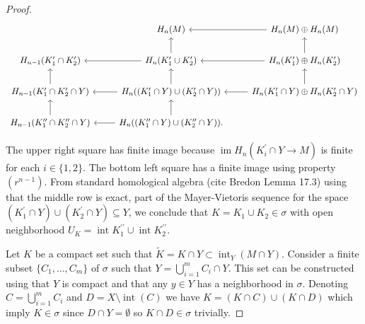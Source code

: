 \documentclass{amsart}
\newcommand{\dprime}{{\prime\prime}}
\DeclareMathOperator{\im}{im}
\DeclareMathOperator{\interior}{int}
\begin{document}
\begin{proof}
		\begin{equation*}
		\begin{tikzcd}
		& H_n(M) & \arrow[l] H_n(M) \oplus H_n(M) \\
		H_{n-1}(K_1^\prime \cap K_2^\prime) & 
		H_{n}(K_1^\prime \cup K_2^\prime) \arrow[l] \arrow[u] &
		H_{n}(K_1^\prime) \oplus H_n(K_2^\prime) \arrow[l] \arrow[u] \\
		H_{n-1}(K_1^\prime \cap K_2^\prime \cap Y) \arrow[u] & 
		H_{n}((K_1^\prime \cap Y) \cup (K_2^\prime \cap Y)) \arrow[l] \arrow[u] &
		H_{n}(K_1^\prime \cap Y) \oplus H_n(K_2^\prime \cap Y) \arrow[l] \arrow[u] \\
		H_{n-1}(K_1^\dprime \cap K_2^\dprime \cap Y) \arrow[u] & 
		H_{n}((K_1^\dprime \cap Y) \cup (K_2^\dprime \cap Y)) \arrow[l] \arrow[u]. &
		\end{tikzcd}
		\end{equation*}
		
		
		The upper right square has finite image because $\im H_n\left(K^\prime_i \cap Y \to M\right)$ is finite for each $i \in \{1, 2\}$. The bottom left square has a finite image using property $(r^{n-1})$. From standard homological algebra (cite Bredon 	Lemma 17.3) using that the middle row is exact, part of the Mayer-Vietoris sequence for the space $(K_1^\prime \cap Y) \cup (K_2^\prime \cap Y) \subseteq Y$, we conclude that $K = K_1 \cup K_2 \in \sigma$ with open neighborhood $U_K = \interior K^\dprime_1 \cup \interior K^\dprime_2$.
		
		Let $K$ be a compact set such that $\widetilde K = K \cap Y \subset \interior_Y(M \cap Y)$.
		Consider a finite subset $\{C_1, \dots, C_m\}$ of $\sigma$ such that $Y = \bigcup_{i=1}^m C_i \cap Y$. This set can be constructed using that $Y$ is compact and that any $y \in Y$ has a neighborhood in $\sigma$. Denoting $C = \bigcup_{i=1}^m C_i$ and $D = X \setminus \interior(C)$ we have $K = (K \cap C) \cup (K \cap D)$ which imply $K \in \sigma$ since $D \cap Y = \emptyset$ so $K \cap D \in \sigma$ trivially.
	\end{proof}
	
\end{document}
